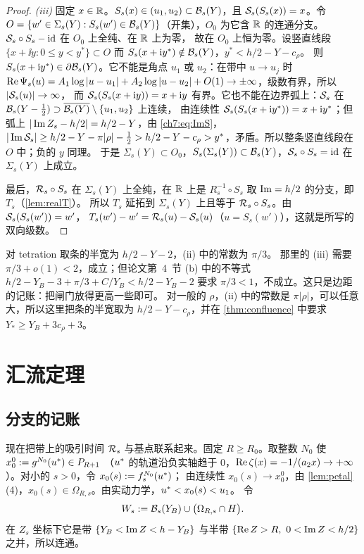 \begin{proof}
\emph{(iii)} 固定 $x\in\mathbb{R}$。$S_s(x)\in(u_1,u_2)\subset\mathcal B_s(Y)$，且 $\mathcal S_s(S_s(x))=x$。令
$O=\{w'\in\Sigma_s(Y):S_s(w')\in\mathcal B_s(Y)\}$（开集），$O_0$ 为它含 $\mathbb{R}$ 的连通分支。$\mathcal S_s\circ S_s-\mathrm{id}$ 在 $O_0$ 上全纯、在 $\mathbb{R}$ 上为零，
故在 $O_0$ 上恒为零。设竖直线段 $\{x+\ii y:0\le y<y^*\}\subset O$ 而 $S_s(x+\mathrm{i} y^*)\notin\mathcal B_s(Y)$，$y^*<h/2-Y-c_\rho$。
则 $S_s(x+\mathrm{i} y^*)\in\partial\mathcal B_s(Y)$。它不能是角点 $u_1$ 或 $u_2$：在带中 $u\to u_j$ 时
$\operatorname{Re}\Psi_s(u)=A_1\log|u-u_1|+A_2\log|u-u_2|+O(1)\to\pm\infty$，级数有界，所以 $|\mathcal S_s(u)|\to\infty$，
而 $\mathcal S_s(S_s(x+\mathrm{i} y))=x+\mathrm{i} y$ 有界。它也不能在边界弧上：$\mathcal S_s$ 在 $\mathcal B_s(Y-\frac12)\supset\overline{\mathcal B_s(Y)}\setminus\{u_1,u_2\}$ 上连续，
由连续性 $\mathcal S_s(S_s(x+\mathrm{i} y^*))=x+\mathrm{i} y^*$；但弧上 $|\operatorname{Im} Z_s-h/2|=h/2-Y$，由 \eqref{ch7:eq:ImS}，
$|\operatorname{Im}\mathcal S_s|\ge h/2-Y-\pi|\rho|-\frac12>h/2-Y-c_\rho>y^*$，矛盾。所以整条竖直线段在 $O$ 中；负的 $y$ 同理。
于是 $\Sigma_s(Y)\subset O_0$，$S_s(\Sigma_s(Y))\subset\mathcal B_s(Y)$，$\mathcal S_s\circ S_s=\mathrm{id}$ 在 $\Sigma_s(Y)$ 上成立。

最后，$\mathcal R_s\circ S_s$ 在 $\Sigma_s(Y)$ 上全纯，在 $\mathbb{R}$ 上是 $R_s^{-1}\circ S_s$ 取 $\operatorname{Im}=h/2$ 的分支，即 $T_s$（\cref{lem:realT}）。
所以 $T_s$ 延拓到 $\Sigma_s(Y)$ 上且等于 $\mathcal R_s\circ S_s$。由 $\mathcal S_s(S_s(w'))=w'$，
$T_s(w')-w'=\mathcal R_s(u)-\mathcal S_s(u)$（$u=S_s(w')$），这就是所写的双向级数。
\end{proof}

\begin{remark}\label{ch7:rem:margin}
\cite[引理~6.1]{KneserPaper} 对 tetration 取条的半宽为 $h/2-Y-2$，(ii) 中的常数为 $\pi/3$。
那里的 (iii) 需要 $\pi/3+o(1)<2$，成立；但论文第~4~节 (b) 中的不等式
$h/2-Y_B-3+\pi/3+C/Y_B<h/2-Y_B-2$ 要求 $\pi/3<1$，不成立。这只是边距的记账：把闸门放得更高一些即可。
对一般的 $\rho$，(ii) 中的常数是 $\pi|\rho|$，可以任意大，所以这里把条的半宽取为 $h/2-Y-c_\rho$，并在
\cref{thm:confluence} 中要求 $Y_*\ge Y_B+3c_\rho+3$。
\end{remark}

\section{汇流定理}\label{ch7:sec:confluence}

\subsection{分支的记账}
现在把带上的吸引时间 $\mathcal R_s$ 与基点联系起来。固定 $R\ge R_0$。取整数 $N_0$ 使 $x_0^0:=g^{N_0}(u^{*})\in P_{R+1}$
（$u^{*}$ 的轨道沿负实轴趋于 $0$，$\operatorname{Re}\zeta(x)=-1/(a_2x)\to+\infty$）。对小的 $s>0$，令 $x_0(s):=f_s^{N_0}(u^{*})$；
由连续性 $x_0(s)\to x_0^0$，由 \cref{lem:petal}(4)，$x_0(s)\in\Omega_{R,s}$。由实动力学，$u^{*}<x_0(s)<u_1$。
令
\[
 W_s:=\mathcal B_s(Y_B)\cup\bigl(\Omega_{R,s}\cap H\bigr).
\]
在 $Z_s$ 坐标下它是带 $\{Y_B<\operatorname{Im} Z<h-Y_B\}$ 与半带 $\{\Rea Z>R,\ 0<\Ima Z<h/2\}$ 之并，所以连通。

